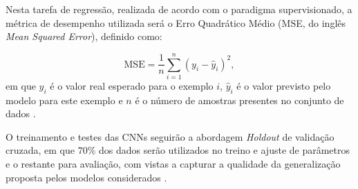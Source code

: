 Nesta tarefa de regressão, realizada de acordo com o paradigma supervisionado, a métrica de desempenho utilizada será o Erro Quadrático Médio (MSE, do inglês \emph{Mean Squared Error}), definido como:

\begin{equation}
\textrm{MSE} = \frac{1}{n}\sum_{i=1}^n (y_i - \hat{y}_i)^{2}, \label{eq:mse}
\end{equation} em que $y_i$ é o valor real esperado para o exemplo $i$, $\hat{y}_i$ é o valor previsto pelo modelo para este exemplo e $n$ é o número de amostras presentes no conjunto de dados \cite{ref:faceli}.

O treinamento e testes das CNNs seguirão a abordagem \emph{Holdout} de validação cruzada, em que $70\%$ dos dados serão utilizados no treino e ajuste de parâmetros e o restante para avaliação, com vistas a capturar a qualidade da generalização proposta pelos modelos considerados \cite{Brink:MachineLearningLivro}.
